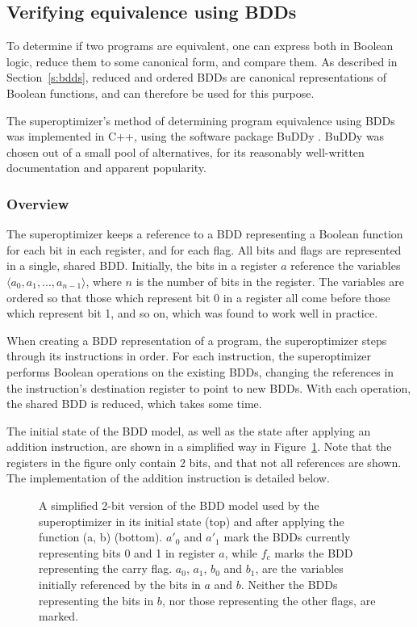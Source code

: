 \documentclass[a4paper,11pt]{kth-mag}
\begin{document}

\subsection{Verifying equivalence using BDDs}
\label{ss:bdd_test}

To determine if two programs are equivalent, one can express both in Boolean logic, reduce them to some canonical form, and compare them.
As described in Section~\ref{s:bdds}, reduced and ordered BDDs are canonical representations of Boolean functions, and can therefore be used for this purpose.

The superoptimizer's method of determining program equivalence using BDDs was implemented in C++, using the software package BuDDy \cite{buddy}.
BuDDy was chosen out of a small pool of alternatives, for its reasonably well-written documentation and apparent popularity.

\subsubsection{Overview}

The superoptimizer keeps a reference to a BDD representing a Boolean function for each bit in each register, and for each flag.
All bits and flags are represented in a single, shared BDD.
Initially, the bits in a register $a$ reference the variables $\langle a_0, a_1, ..., a_{n-1} \rangle$, where $n$ is the number of bits in the register.
The variables are ordered so that those which represent bit 0 in a register all come before those which represent bit 1, and so on, which was found to work well in practice.

When creating a BDD representation of a program, the superoptimizer steps through its instructions in order.
For each instruction, the superoptimizer performs Boolean operations on the existing BDDs, changing the references in the instruction's destination register to point to new BDDs.
With each operation, the shared BDD is reduced, which takes some time.

The initial state of the BDD model, as well as the state after applying an addition instruction, are shown in a simplified way in Figure~\ref{fig:bdd_add}.
Note that the registers in the figure only contain 2 bits, and that not all references are shown.
The implementation of the addition instruction is detailed below.

\begin{figure}
\centering


\caption{A simplified 2-bit version of the BDD model used by the superoptimizer in its initial state (top) and after applying the function (a, b) (bottom).
$a'_0$ and $a'_1$ mark the BDDs currently representing bits 0 and 1 in register $a$, while $f_c$ marks the BDD representing the carry flag.
$a_0$, $a_1$, $b_0$ and $b_1$, are the variables initially referenced by the bits in $a$ and $b$.
Neither the BDDs representing the bits in $b$, nor those representing the other flags, are marked.}
\label{fig:bdd_add}
\end{figure}
\end{document}
